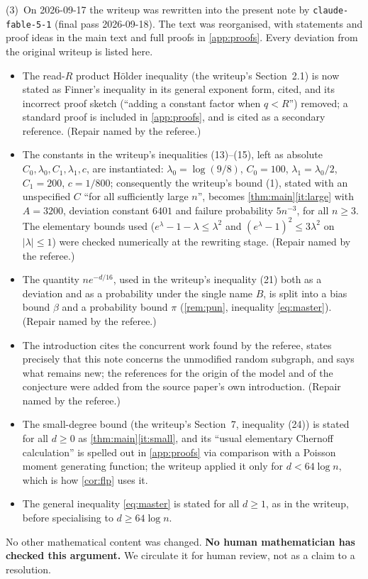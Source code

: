 \documentclass[11pt,a4paper]{article}
\theoremstyle{plain}
\theoremstyle{definition}
\theoremstyle{remark}
\begin{document}
(3)~On 2026-09-17 the writeup was rewritten into the present note by \texttt{claude-fable-5-1} (final pass 2026-09-18). The text was reorganised, with statements and proof ideas in the main text and full proofs in \cref{app:proofs}. Every deviation from the original writeup is listed here.
\begin{itemize}[itemsep=1pt]
\item The read-$R$ product H\"older inequality (the writeup's Section~2.1) is now stated as Finner's inequality \cite{Finner92} in its general exponent form, cited, and its incorrect proof sketch (``adding a constant factor when $q<R$'') removed; a standard proof is included in \cref{app:proofs}, and \cite{PR17} is cited as a secondary reference. (Repair named by the referee.)
\item The constants in the writeup's inequalities (13)--(15), left as absolute $C_0,\lambda_0,C_1,\lambda_1,c$, are instantiated: $\lambda_0=\log(9/8)$, $C_0=100$, $\lambda_1=\lambda_0/2$, $C_1=200$, $c=1/800$; consequently the writeup's bound (1), stated with an unspecified $C$ ``for all sufficiently large $n$'', becomes \cref{thm:main}\ref{it:large} with $A=3200$, deviation constant $6401$ and failure probability $5n^{-3}$, for all $n\ge3$. The elementary bounds used ($e^\lambda-1-\lambda\le\lambda^2$ and $(e^\lambda-1)^2\le3\lambda^2$ on $|\lambda|\le1$) were checked numerically at the rewriting stage. (Repair named by the referee.)
\item The quantity $ne^{-d/16}$, used in the writeup's inequality (21) both as a deviation and as a probability under the single name $B$, is split into a bias bound $\beta$ and a probability bound $\pi$ (\cref{rem:pun}, inequality \eqref{eq:master}). (Repair named by the referee.)
\item The introduction cites the concurrent work \cite{MPS26,CTW26} found by the referee, states precisely that this note concerns the unmodified random subgraph, and says what remains new; the references \cite{FGKP02,AW23} for the origin of the model and of the conjecture were added from the source paper's own introduction. (Repair named by the referee.)
\item The small-degree bound (the writeup's Section~7, inequality (24)) is stated for all $d\ge0$ as \cref{thm:main}\ref{it:small}, and its ``usual elementary Chernoff calculation'' is spelled out in \cref{app:proofs} via comparison with a Poisson moment generating function; the writeup applied it only for $d<64\log n$, which is how \cref{cor:flp} uses it.
\item The general inequality \eqref{eq:master} is stated for all $d\ge1$, as in the writeup, before specialising to $d\ge64\log n$.
\end{itemize}
No other mathematical content was changed. \textbf{No human mathematician has checked this argument.} We circulate it for human review, not as a claim to a resolution.
\end{document}
